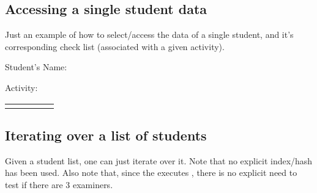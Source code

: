 \documentclass[10pt]{article}
\begin{document}


\subsection{Accessing a single student data}
Just an example of how to select/access the data of a single student, and it's corresponding check list (associated with a given activity).

\begin{codestore}
Student's Name: 

Activity: 

\begingroup
  \scriptsize
  \begin{tabular}{lllll}
  \StudentCheckListTable{L1,L2,L3}{C1,C2,C3,C4,C5}
  \end{tabular}
\endgroup
\end{codestore}


\subsection{Iterating over a list of students}
Given a student list, one can just iterate over it. Note that no explicit index/hash has been used. Also note that, since the \tsobj{\studentlistiterate} executes \tsobj{\listemptytermsifnone}, there is no explicit  need to test if there are 3 examiners.
\end{document}
